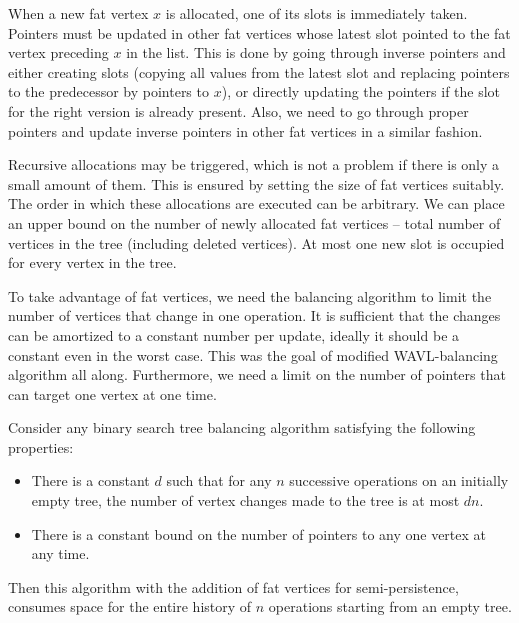 When a new fat vertex $x$ is allocated, one of its slots is immediately taken. 
Pointers must be updated in other fat vertices whose latest slot  pointed to the fat vertex preceding $x$ in the list. 
This is done by going through inverse pointers and either creating slots (copying all values from the latest slot and replacing pointers to the predecessor by pointers to $x$), or directly updating the pointers if the slot for the right version is already present. 
Also, we need to go through proper pointers and update inverse pointers in other fat vertices in a similar fashion.

Recursive allocations may be triggered, which is not a problem if there is only a small amount of them. 
This is ensured by setting the size of fat vertices suitably. 
The order in which these allocations are executed can be arbitrary.
We can place an upper bound on the number of newly allocated fat vertices -- total number of vertices in the tree (including deleted vertices). 
At most one new slot is occupied for every vertex in the tree.

To take advantage of fat vertices, we need the balancing algorithm to limit the number of vertices that change in one operation. 
It is sufficient that the changes can be amortized to a constant number per update, ideally it should be a constant even in the worst case.
This was the goal of modified WAVL-balancing algorithm all along. 
Furthermore, we need a limit on the number of pointers that can target one vertex at one time.

\begin{prop}
Consider any binary search tree balancing algorithm satisfying the following properties:
\begin{itemize}
\item 
There is a constant $d$ such that for any $n$ successive operations on an initially empty tree, the number of vertex changes made to the tree is at most $dn$. 
\item 
There is a constant bound on the number of pointers to any one vertex at any time.
\end{itemize}
Then this algorithm with the addition of fat vertices for semi-persistence, consumes  space for the entire history of $n$ operations starting from an empty tree.
\end{prop}

